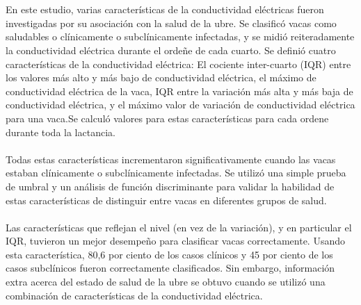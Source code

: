 \documentclass[a4paper, 11pt]{article}
\begin{document}
\section{\cite{2004b}}
En este estudio, varias características de la conductividad eléctricas fueron investigadas por su asociación con la salud de la ubre. 
 Se clasificó vacas como saludables o clínicamente o subclínicamente infectadas, y se midió reiteradamente la conductividad eléctrica durante el ordeñe de cada cuarto. Se definió cuatro características de la conductividad eléctrica: El cociente inter-cuarto (IQR) entre los valores más alto y más bajo de conductividad eléctrica, el máximo de conductividad eléctrica de la vaca, IQR entre la variación más alta y más baja de conductividad eléctrica, y el máximo valor de variación de conductividad eléctrica para una vaca.Se calculó valores para estas características para cada ordene durante toda la lactancia.\\\\
Todas estas características incrementaron significativamente cuando las vacas estaban clínicamente o subclínicamente infectadas. Se utilizó una simple prueba de umbral y un análisis de función discriminante para validar la habilidad de estas características de distinguir entre vacas en diferentes grupos de salud.\\\\ Las características que reflejan el nivel (en vez de la variación), y en particular el IQR, tuvieron un mejor desempeño para clasificar vacas correctamente. Usando esta característica, 80,6 por ciento de los casos clínicos y 45 por ciento de los casos subclínicos fueron correctamente clasificados. Sin embargo, información extra acerca del estado de salud de la ubre se obtuvo cuando se utilizó una combinación de características de la conductividad eléctrica.\\\\
\end{document}
